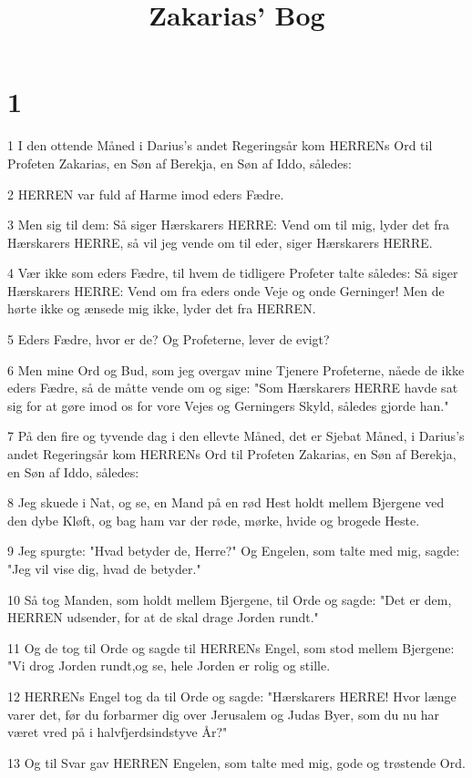 

\title{Zakarias' Bog}


\chapter{1}

\par 1 I den ottende Måned i Darius's andet Regeringsår kom HERRENs Ord til Profeten Zakarias, en Søn af Berekja, en Søn af Iddo, således:
\par 2 HERREN var fuld af Harme imod eders Fædre.
\par 3 Men sig til dem: Så siger Hærskarers HERRE: Vend om til mig, lyder det fra Hærskarers HERRE, så vil jeg vende om til eder, siger Hærskarers HERRE.
\par 4 Vær ikke som eders Fædre, til hvem de tidligere Profeter talte således: Så siger Hærskarers HERRE: Vend om fra eders onde Veje og onde Gerninger! Men de hørte ikke og ænsede mig ikke, lyder det fra HERREN.
\par 5 Eders Fædre, hvor er de? Og Profeterne, lever de evigt?
\par 6 Men mine Ord og Bud, som jeg overgav mine Tjenere Profeterne, nåede de ikke eders Fædre, så de måtte vende om og sige: "Som Hærskarers HERRE havde sat sig for at gøre imod os for vore Vejes og Gerningers Skyld, således gjorde han."
\par 7 På den fire og tyvende dag i den ellevte Måned, det er Sjebat Måned, i Darius's andet Regeringsår kom HERRENs Ord til Profeten Zakarias, en Søn af Berekja, en Søn af Iddo, således:
\par 8 Jeg skuede i Nat, og se, en Mand på en rød Hest holdt mellem Bjergene ved den dybe Kløft, og bag ham var der røde, mørke, hvide og brogede Heste.
\par 9 Jeg spurgte: "Hvad betyder de, Herre?" Og Engelen, som talte med mig, sagde: "Jeg vil vise dig, hvad de betyder."
\par 10 Så tog Manden, som holdt mellem Bjergene, til Orde og sagde: "Det er dem, HERREN udsender, for at de skal drage Jorden rundt."
\par 11 Og de tog til Orde og sagde til HERRENs Engel, som stod mellem Bjergene: "Vi drog Jorden rundt,og se, hele Jorden er rolig og stille.
\par 12 HERRENs Engel tog da til Orde og sagde: "Hærskarers HERRE! Hvor længe varer det, før du forbarmer dig over Jerusalem og Judas Byer, som du nu har været vred på i halvfjerdsindstyve År?"
\par 13 Og til Svar gav HERREN Engelen, som talte med mig, gode og trøstende Ord.
